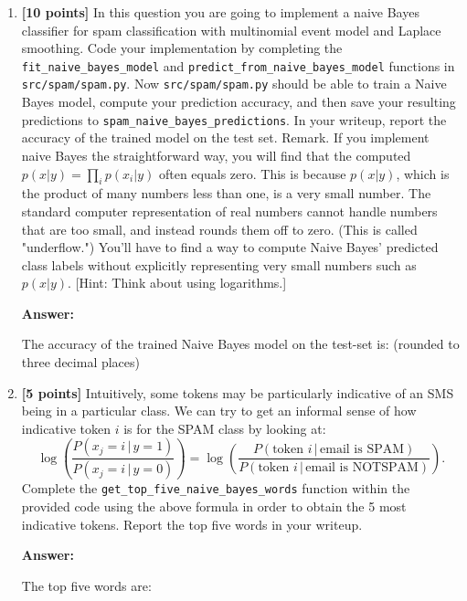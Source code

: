 \documentclass{article}
\begin{document}
\begin{enumerate}[label=\alph*)]
\item \textbf{[10 points]} In this question you are going to implement a naive Bayes classifier for spam
classification with multinomial event model and Laplace smoothing.
Code your implementation by completing the \texttt{fit\_naive\_bayes\_model} and
\texttt{predict\_from\_naive\_bayes\_model} functions in \texttt{src/spam/spam.py}.
Now \texttt{src/spam/spam.py} should be able to train a Naive Bayes model, compute your prediction
accuracy, and then save your resulting predictions to \texttt{spam\_naive\allowbreak\allowbreak\_bayes\allowbreak\allowbreak\_predictions}.
In your writeup, report the accuracy of the trained model on the test set.
Remark. If you implement naive Bayes the straightforward way, you will find that the
computed $p(x|y) = \prod_i p(x_i|y)$ often equals zero. This is because $p(x|y)$, which is the
product of many numbers less than one, is a very small number. The standard computer
representation of real numbers cannot handle numbers that are too small, and instead
rounds them off to zero. (This is called "underflow.") You'll have to find a way to compute
Naive Bayes' predicted class labels without explicitly representing very small numbers such
as $p(x|y)$. [Hint: Think about using logarithms.]

\textbf{Answer:}

The accuracy of the trained Naive Bayes model on the test-set is:   (rounded to three decimal places)

\item \textbf{[5 points]} Intuitively, some tokens may be particularly indicative of an SMS being in a particular class. We can try to get an informal sense of how indicative token $i$ is for the SPAM class by looking at:
\[
\log \left( \frac{{P(x_j = i \,|\, y = 1)}}{{P(x_j = i \,|\, y = 0)}} \right) = \log \left( \frac{{P(\text{token } i \,|\, \text{email is SPAM})}}{{P(\text{token } i \,|\, \text{email is NOTSPAM})}} \right).
\]
Complete the \texttt{get\_top\_five\_naive\_bayes\_words} function within the provided code using the above formula in order to obtain the 5 most indicative tokens. Report the top five words in your writeup.

\textbf{Answer:}

The top five words are:


\end{enumerate}
\end{document}
